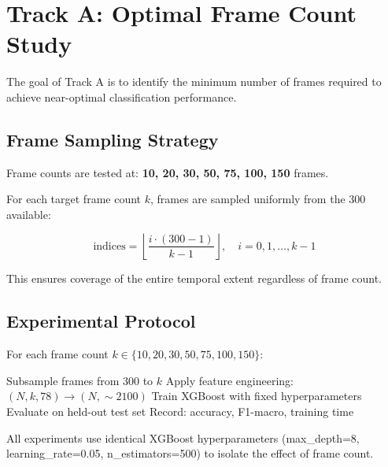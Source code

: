 \documentclass[11pt,a4paper]{article}
\begin{document}
\section{Track A: Optimal Frame Count Study}\label{sec:track-a}

The goal of Track A is to identify the minimum number of frames required to achieve near-optimal classification performance.

\subsection{Frame Sampling Strategy}

Frame counts are tested at: \textbf{10, 20, 30, 50, 75, 100, 150} frames.

For each target frame count $k$, frames are sampled uniformly from the 300 available:

\begin{equation}
    \text{indices} = \left\lfloor \frac{i \cdot (300 - 1)}{k - 1} \right\rfloor, \quad i = 0, 1, \ldots, k-1
\end{equation}

This ensures coverage of the entire temporal extent regardless of frame count.

\subsection{Experimental Protocol}

For each frame count $k \in \{10, 20, 30, 50, 75, 100, 150\}$:

\begin{algorithm}[H]
\caption{Track A Experimental Protocol}
\begin{algorithmic}[1]
\State Subsample frames from 300 to $k$
\State Apply feature engineering: $(N, k, 78) \rightarrow (N, \sim 2100)$
\State Train XGBoost with fixed hyperparameters
\State Evaluate on held-out test set
\State Record: accuracy, F1-macro, training time
\end{algorithmic}
\end{algorithm}

All experiments use identical XGBoost hyperparameters (max\_depth=8, learning\_rate=0.05, n\_estimators=500) to isolate the effect of frame count.

\end{document}
